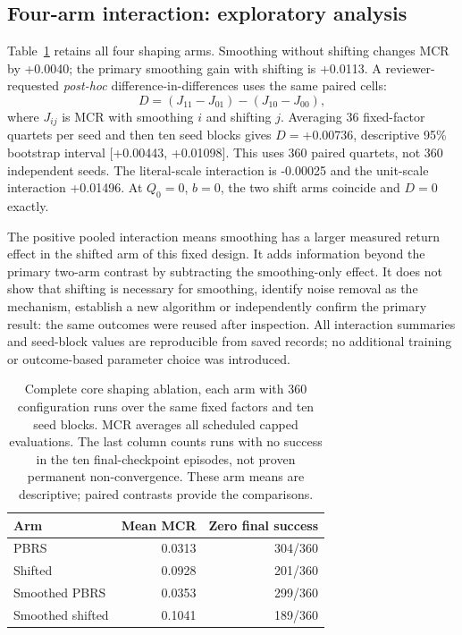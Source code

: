 \documentclass{COMPXXXX}
\begin{document}
\subsection{Four-arm interaction: exploratory analysis}
Table~\ref{tab:arms} retains all four shaping arms. Smoothing without shifting changes MCR by +0.0040; the primary smoothing gain with shifting is +0.0113. A reviewer-requested \emph{post-hoc} difference-in-differences uses the same paired cells:
\begin{equation}
D=(J_{11}-J_{01})-(J_{10}-J_{00}),
\label{eq:interaction}
\end{equation}
where $J_{ij}$ is MCR with smoothing $i$ and shifting $j$. Averaging 36 fixed-factor quartets per seed and then ten seed blocks gives $D=$+0.00736, descriptive 95\% bootstrap interval [+0.00443, +0.01098]. This uses 360 paired quartets, not 360 independent seeds. The literal-scale interaction is -0.00025 and the unit-scale interaction +0.01496. At $Q_0=0$, $b=0$, the two shift arms coincide and $D=0$ exactly.

The positive pooled interaction means smoothing has a larger measured return effect in the shifted arm of this fixed design. It adds information beyond the primary two-arm contrast by subtracting the smoothing-only effect. It does not show that shifting is necessary for smoothing, identify noise removal as the mechanism, establish a new algorithm or independently confirm the primary result: the same outcomes were reused after inspection. All interaction summaries and seed-block values are reproducible from saved records; no additional training or outcome-based parameter choice was introduced.

\begin{table}
\centering
\begin{tabular}{lrr}
\hline
Arm & Mean MCR & Zero final success\\
\hline
PBRS & 0.0313 & 304/360 \\
Shifted & 0.0928 & 201/360 \\
Smoothed PBRS & 0.0353 & 299/360 \\
Smoothed shifted & 0.1041 & 189/360 \\
\hline
\end{tabular}
\caption{Complete core shaping ablation, each arm with 360 configuration runs over the same fixed factors and ten seed blocks. MCR averages all scheduled capped evaluations. The last column counts runs with no success in the ten final-checkpoint episodes, not proven permanent non-convergence. These arm means are descriptive; paired contrasts provide the comparisons.}
\label{tab:arms}
\end{table}
\end{document}
